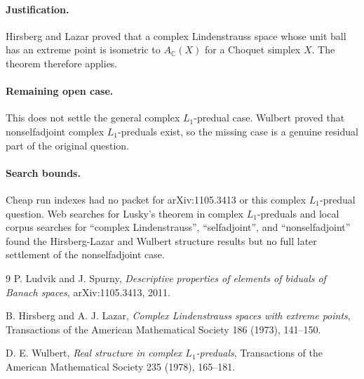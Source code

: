 \documentclass[11pt]{article}
\begin{document}
\paragraph{Justification.}
Hirsberg and Lazar proved that a complex Lindenstrauss space whose unit ball has
an extreme point is isometric to \(A_{\mathbb C}(X)\) for a Choquet simplex
\(X\). The theorem therefore applies.

\paragraph{Remaining open case.}
This does not settle the general complex \(L_1\)-predual case. Wulbert proved
that nonselfadjoint complex \(L_1\)-preduals exist, so the missing case is a
genuine residual part of the original question.

\paragraph{Search bounds.}
Cheap run indexes had no packet for arXiv:1105.3413 or this complex
\(L_1\)-predual question. Web searches for Lusky's theorem in complex
\(L_1\)-preduals and local corpus searches for ``complex Lindenstrauss'',
``selfadjoint'', and ``nonselfadjoint'' found the Hirsberg-Lazar and Wulbert
structure results but no full later settlement of the nonselfadjoint case.

\begin{thebibliography}{9}
P. Ludvik and J. Spurny,
\emph{Descriptive properties of elements of biduals of Banach spaces},
arXiv:1105.3413, 2011.

B. Hirsberg and A. J. Lazar,
\emph{Complex Lindenstrauss spaces with extreme points},
Transactions of the American Mathematical Society 186 (1973), 141--150.

D. E. Wulbert,
\emph{Real structure in complex \(L_1\)-preduals},
Transactions of the American Mathematical Society 235 (1978), 165--181.
\end{thebibliography}
\end{document}
